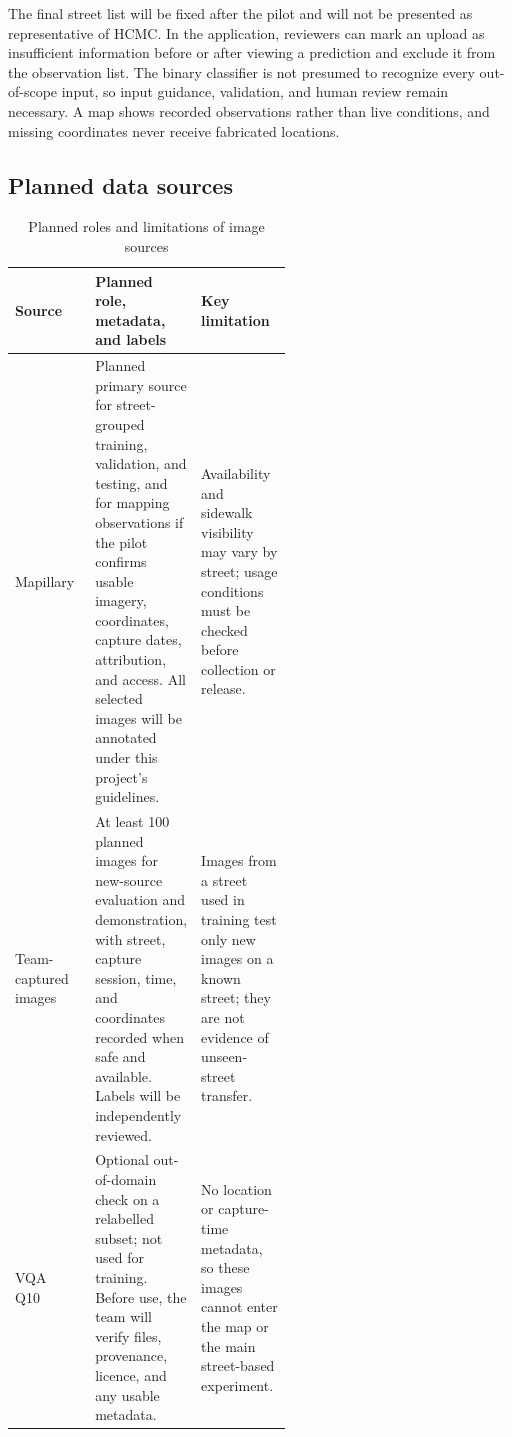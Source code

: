 The final street list will be fixed after the pilot and will not be presented as representative of HCMC. In the application, reviewers can mark an upload as insufficient information before or after viewing a prediction and exclude it from the observation list. The binary classifier is not presumed to recognize every out-of-scope input, so input guidance, validation, and human review remain necessary. A map shows recorded observations rather than live conditions, and missing coordinates never receive fabricated locations.

\subsection{Planned data sources}

\begin{table}[H]
\centering
\caption{Planned roles and limitations of image sources}
\label{tab:sources}
\begin{tabularx}{\textwidth}{>{\raggedright\arraybackslash}p{0.18\linewidth}>{\raggedright\arraybackslash}p{0.37\linewidth}J}
\toprule
\textbf{Source} & \textbf{Planned role, metadata, and labels} & \textbf{Key limitation} \\
\midrule
Mapillary~\cite{mapillary2024intro} &
Planned primary source for street-grouped training, validation, and testing, and for mapping observations if the pilot confirms usable imagery, coordinates, capture dates, attribution, and access. All selected images will be annotated under this project's guidelines. &
Availability and sidewalk visibility may vary by street; usage conditions must be checked before collection or release. \\
Team-captured images &
At least 100 planned images for new-source evaluation and demonstration, with street, capture session, time, and coordinates recorded when safe and available. Labels will be independently reviewed. &
Images from a street used in training test only new images on a known street; they are not evidence of unseen-street transfer. \\
VQA Q10~\cite{dao2026viahevqa} &
Optional out-of-domain check on a relabelled subset; not used for training. Before use, the team will verify files, provenance, licence, and any usable metadata. &
No location or capture-time metadata, so these images cannot enter the map or the main street-based experiment. \\
\bottomrule
\end{tabularx}
\end{table}

